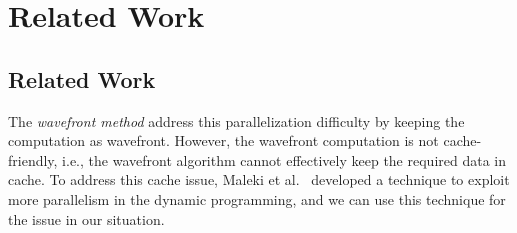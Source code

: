 \ifdefined\MasterThesis
\chapter{Related Work}
\else
\section{Related Work}
\fi
\label{sec:RelatedWork}

The {\em wavefront method} address this parallelization difficulty by
keeping the computation as wavefront.  However, the wavefront
computation is not cache-friendly, i.e., the wavefront algorithm cannot
effectively keep the required data in cache.  To address this cache
issue, Maleki et al.~\cite{Maleki2016EfficientPU} developed a technique
to exploit more parallelism in the dynamic programming, and we can use
this technique for the issue in our situation.


\iffalse

先有 linear-tropical dynamic programming (LTDP) 的性質，
LTDP 可以拆成好幾個序列子問題，每個子問題依賴前一個子問題的最佳解，
我們可以將 LTDP 假想成好幾個子矩陣 (子問題) 的連乘 (合併)，
平行方法：
(1) 子問題分開解決，並保留最佳解 
(2) 傳遞前一個子問題的最佳解 
(3) 修正錯誤的區塊，並更新最佳解

當 rank = 1 時，
子問題 u 的最佳解到子問題 v 的最佳解只會經過一個節點 (轉換)。

因此，原先的問題相當於 rank = n，最佳解會經過 n 個點。

The linear-tropical dynamic programming
problem~\cite{Maleki2016EfficientPU} which has the property of {\em
  rank convergence} can be divided into the sub-problems, such as a
sequence of stages, which a solution of the sub-problems depends on
only the solutions of the previous sub-problem.  About rank
convergence in VGLCS problem, the sub-problems has developed efficient
algorithm by Peng.  However, the parallel forward phase is difficult
to integrate the partial correct and incorrect solution in
parallelization algorithm which using rank convergence.
\fi

